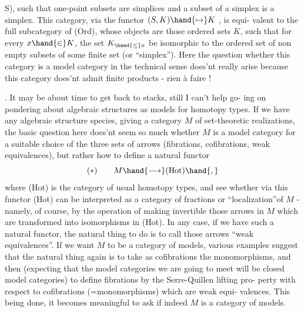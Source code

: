 
S),  such that one-point subsets are simplices and a subset of a simplex
is a simplex.  This category,  via the functor   $(S,K)\hand{\mapsto} K$ ,  is equi-%
valent to the full subcategory of (Ord),  whose objects are those ordered
sets $K$,  such that for every $x\hand{\in}K$,  the set $K_{\hand{\leq}x}$  be isomorphic to the
ordered set of  non empty subsets of some finite set (or ``simplex'').
Here  the question  whether  this category is a model category
in the technical sense \inserted{[of Quillen]} does'nt really arise\hand{,} because this category
does'nt  admit finite products -  rien à faire !

.  It may be about time to get back to stacks,  still I can't help go-%
ing on pondering about algebraic structures as models for homotopy types.
If we have any algebraic structure species,  giving  a category $M$ of
set-theoretic realizations,  the basic question here does'nt seem so
much whether $M$ is a model category for a suitable choice of the three
sets of arrows (fibrations,  cofibrations,  weak equivalences),  but
rather how to define a natural functor
\[ (*) \qquad M \hand{\longrightarrow} (\mathrm{Hot}) \hand{,} \]
where (Hot) is the category of usual homotopy types,  and see whether
via this functor (Hot) can be interpreted as a category of fractions
\hand{(}or ``localization''\hand{)}of $M$  -  namely,  of course,  by the operation of making
invertible those arrows in $M$ which are transformed into isomorphisms
in (Hot).  In any case,  if we have such a natural functor,  the natural
thing to do is to call those arrows ``weak equivalences''.  If we want $M$
to be a category of models,  various examples suggest that the natural
thing again is to take as cofibrations the monomorphisms,\hand{,} and then
(expecting that the model categories we are going to meet will be closed
model categories) to define fibrations by the Serre-Quillen lifting pro-%
perty with respect to cofibrations (=monomorphisms) which are weak equi-%
valences.  This being done,  it becomes meaningful to ask if indeed $M$
is a category of models.


